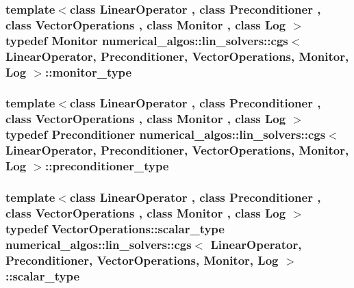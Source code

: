 \hypertarget{classnumerical__algos_1_1lin__solvers_1_1cgs_af176eeddd3d6fc34241c1796ba381cf1}{
\subsubsection[{monitor\-\_\-type}]{\setlength{\rightskip}{0pt plus 5cm}template$<$class Linear\-Operator , class Preconditioner , class Vector\-Operations , class Monitor , class Log $>$ typedef Monitor {\bf numerical\-\_\-algos\-::lin\-\_\-solvers\-::cgs}$<$ Linear\-Operator, Preconditioner, Vector\-Operations, Monitor, Log $>$\-::{\bf monitor\-\_\-type}}}\label{classnumerical__algos_1_1lin__solvers_1_1cgs_af176eeddd3d6fc34241c1796ba381cf1}
\hypertarget{classnumerical__algos_1_1lin__solvers_1_1cgs_ade373d56aec3d0a0c6414f773ca4f97f}{
\subsubsection[{preconditioner\-\_\-type}]{\setlength{\rightskip}{0pt plus 5cm}template$<$class Linear\-Operator , class Preconditioner , class Vector\-Operations , class Monitor , class Log $>$ typedef Preconditioner {\bf numerical\-\_\-algos\-::lin\-\_\-solvers\-::cgs}$<$ Linear\-Operator, Preconditioner, Vector\-Operations, Monitor, Log $>$\-::{\bf preconditioner\-\_\-type}}}\label{classnumerical__algos_1_1lin__solvers_1_1cgs_ade373d56aec3d0a0c6414f773ca4f97f}
\hypertarget{classnumerical__algos_1_1lin__solvers_1_1cgs_a11a8155d321473c5940d28c23808154d}{
\subsubsection[{scalar\-\_\-type}]{\setlength{\rightskip}{0pt plus 5cm}template$<$class Linear\-Operator , class Preconditioner , class Vector\-Operations , class Monitor , class Log $>$ typedef Vector\-Operations\-::scalar\-\_\-type {\bf numerical\-\_\-algos\-::lin\-\_\-solvers\-::cgs}$<$ Linear\-Operator, Preconditioner, Vector\-Operations, Monitor, Log $>$\-::{\bf scalar\-\_\-type}}}\label{classnumerical__algos_1_1lin__solvers_1_1cgs_a11a8155d321473c5940d28c23808154d}
